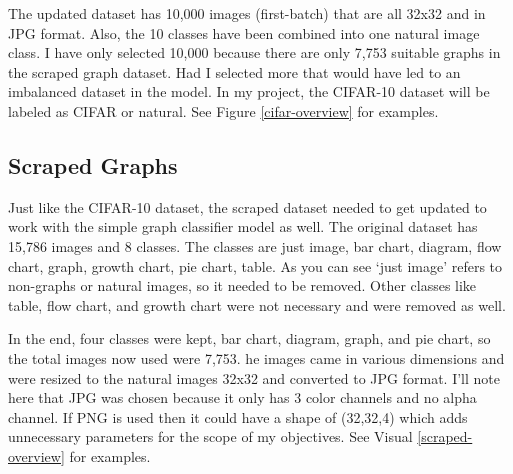 \documentclass[12pt]{article}
\begin{document}
            The updated dataset has 10,000 images (first-batch) that are all 32x32 and in JPG format. 
            Also, the 10 classes have been combined into one natural image class. 
            I have only selected 10,000 because there are only 7,753 suitable graphs in the scraped graph dataset. 
            Had I selected more that would have led to an imbalanced dataset in the model. 
            In my project, the CIFAR-10 dataset will be labeled as CIFAR or natural. See Figure \ref{cifar-overview} for examples.


            
        \subsection{Scraped Graphs}
    
            Just like the CIFAR-10 dataset, the scraped dataset \cite{sunedition2021} needed to get updated to work 
            with the simple graph classifier model as well. The original dataset has 15,786 images and 8 classes. 
            The classes are just image, bar chart, diagram, flow chart, graph, growth chart, pie chart, table. 
            As you can see ‘just image’ refers to non-graphs or natural images, so it needed to be removed. 
            Other classes like table, flow chart, and growth chart were not necessary and were removed as well.

            In the end, four classes were kept, bar chart, diagram, graph, and pie chart, 
            so the total images now used were 7,753. 
            he images came in various dimensions and were resized to the natural images 32x32 and converted to JPG format. 
            I’ll note here that JPG was chosen because it only has 3 color channels and no alpha channel. 
            If PNG is used then it could have a shape of (32,32,4) which adds unnecessary parameters for the scope of my objectives.
            See Visual \ref{scraped-overview} for examples.
            
\end{document}
